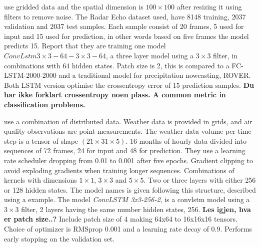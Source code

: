  use gridded data and the spatial dimension is $100\times 100$ after resizing it using filters to remove noise. The Radar Echo dataset used, have 8148 training, 2037 validation and 2037 test samples. Each sample consist of 20 frames, 5 used for input and 15 used for prediction, in other words based on five frames the model predicts 15. Report that they are training one model $ConvLstm 3\times 3-64-3\times 3-64$, a three layer model using a $3\times 3$ filter, in combinations with 64 hidden states. Patch size is 2, this is compared to a FC-LSTM-2000-2000 and a traditional model for precipitation nowcasting, ROVER. Both LSTM version optimise the crossentropy error of 15 prediction samples. \textbf{Du har ikke forklart crossentropy noen plass. A common metric in classification problems.}

 use a combination of distributed data. Weather data is provided in grids, and air quality observations are point measurements. The weather data volume per time step is a tensor of shape $(21 \times 31 \times 5)$. 16 months of hourly data divided into sequences of 72 frames, 24 for input and 48 for prediction. %
They use a learning rate scheduler dropping from 0.01 to 0.001 after five epochs. Gradient clipping to avoid exploding gradients when training longer sequences. Combinations of kernels with dimensions $1\times 1$, $3\times 3$ and $5\times 5$. Two or three layers with either 256 or 128 hidden states. The model names is given following this structure, described using a example. The model \textit{ConvLSTM 3x3-256-2}, is a \acrshort{convlstm} model using a $3\times 3$ filter, 2 layers having the same number hidden states, 256.
\textbf{Les igjen, hva er patch size..?}
Include patch size of 4 making 64x64 to 16x16x16 tensors. Choice of optimizer is RMSprop 0.001 and a learning rate decay of 0.9. Performs early stopping on the validation set.



